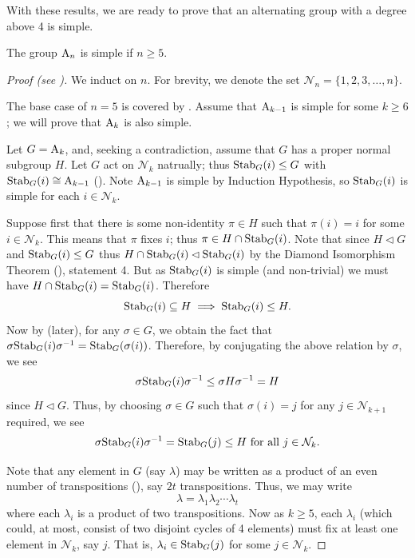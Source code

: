 With these results, we are ready to prove that an alternating group with a degree above 4 is simple.
\begin{theorem}\label{thrm-An-is-simple-for-n>=5}
    The group $\mathrm{A}_{n}$ is simple if $n \geq 5$.
\end{theorem}
\begin{proof}[Proof (see {\cite[pp.~149--150, Theorem 24]{dummit_foote_2004}})]
    We induct on $n$. For brevity, we denote the set $\mathcal{N}_n = \{1, 2, 3, \dots, n\}$.
    
    The base case of $n = 5$ is covered by . Assume that $\mathrm{A}_{k-1}$ is simple for some $k \geq 6$; we will prove that $\mathrm{A}_{k}$ is also simple.

    Let $G = \mathrm{A}_{k}$, and, seeking a contradiction, assume that $G$ has a proper normal subgroup $H$. Let $G$ act on $\mathcal{N}_{k}$ natrually; thus $\mathrm{Stab}_{G}(i) \leq G$ with $\mathrm{Stab}_{G}(i) \cong \mathrm{A}_{k-1}$ (). Note $\mathrm{A}_{k-1}$ is simple by Induction Hypothesis, so $\mathrm{Stab}_{G}(i)$ is simple for each $i \in \mathcal{N}_{k}$.

    Suppose first that there is some non-identity $\pi \in H$ such that $\pi(i) = i$ for some $i \in \mathcal{N}_{k}$. This means that $\pi$ fixes $i$; thus $\pi \in H \cap \mathrm{Stab}_{G}(i)$. Note that since $H \lhd G$ and $\mathrm{Stab}_{G}(i) \leq G$ thus $H \cap \mathrm{Stab}_{G}(i) \lhd \mathrm{Stab}_{G}(i)$ by the Diamond Isomorphism Theorem (), statement 4. But as $\mathrm{Stab}_{G}(i)$ is simple (and non-trivial) we must have $H \cap \mathrm{Stab}_{G}(i) = \mathrm{Stab}_{G}(i)$. Therefore
    \[
        \mathrm{Stab}_{G}(i) \subseteq H \implies \mathrm{Stab}_{G}(i) \leq H.
    \]
    Now by  (later), for any $\sigma \in G$, we obtain the fact that $\sigma\mathrm{Stab}_{G}(i)\sigma^{-1} = \mathrm{Stab}_{G}(\sigma(i))$. Therefore, by conjugating the above relation by $\sigma$, we see
    \[
        \sigma\mathrm{Stab}_{G}(i)\sigma^{-1} \leq \sigma H\sigma^{-1} = H
    \]
    since $H \lhd G$. Thus, by choosing $\sigma \in G$ such that $\sigma(i) = j$ for any $j \in \mathcal{N}_{k+1}$ required, we see
    \[
        \sigma\mathrm{Stab}_{G}(i)\sigma^{-1} = \mathrm{Stab}_{G}(j) \leq H \text{ for all } j \in \mathcal{N}_{k}.
    \]
    
    Note that any element in $G$ (say $\lambda$) may be written as a product of an even number of transpositions (), say $2t$ transpositions. Thus, we may write
    \[
        \lambda = \lambda_1\lambda_2\cdots\lambda_t
    \]
    where each $\lambda_i$ is a product of two transpositions. Now as $k \geq 5$, each $\lambda_i$ (which could, at most, consist of two disjoint cycles of 4 elements) must fix at least one element in $\mathcal{N}_{k}$, say $j$. That is, $\lambda_i \in \mathrm{Stab}_{G}(j)$ for some $j \in \mathcal{N}_{k}$.
    

\end{proof}
